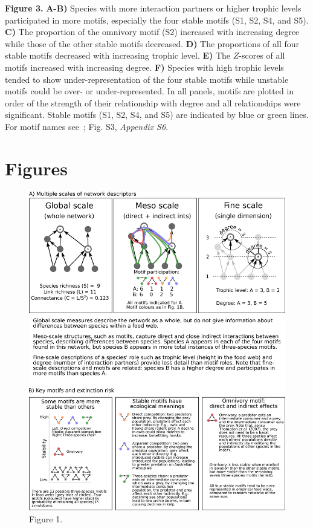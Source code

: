 \documentclass[12pt]{article}
\begin{document}
\begin{spacing}{2.0}
	\noindent\textbf{Figure 3.} \textbf{A-B)} Species with more interaction partners or higher trophic levels participated in more motifs, especially the four stable motifs (S1, S2, S4, and S5). 
        \textbf{C)} The proportion of the omnivory motif (S2) increased with increasing degree while those of the other stable motifs decreased. \textbf{D)} The proportions of all four stable motifs  decreased with increasing trophic level.
		\textbf{E)} The $Z$-scores of all motifs increased with increasing degree.
        \textbf{F)} Species with high trophic levels tended to show under-representation of the four stable motifs while unstable motifs could be over- or under-represented. 
        In all panels, motifs are plotted in order of the strength of their relationship with degree and all relationships were significant. 
        Stable motifs (S1, S2, S4, and S5) are indicated by blue or green lines. 
        For motif names see~\citet{Stouffer2007}; Fig. S3, \emph{Appendix S6}.
\end{spacing}

\clearpage

\section*{Figures}


    \begin{figure}[h!]
        \caption{Figure 1.}
        \label{motifs}
        \includegraphics[width=.9\textwidth]{figures/motifs_box.eps}
    \end{figure}
\end{document}
